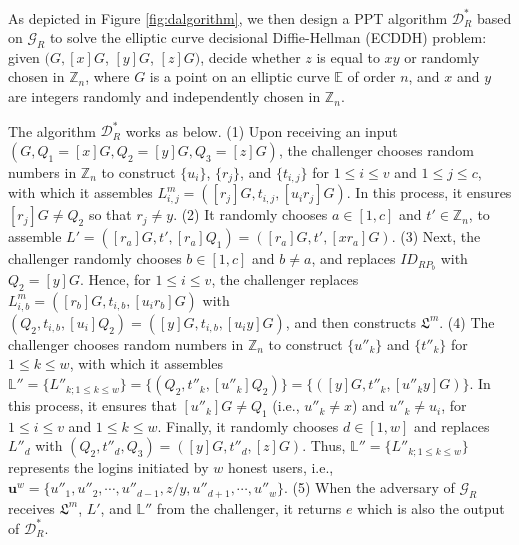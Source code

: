 As depicted in Figure \ref{fig:dalgorithm}, we then design a PPT algorithm $\mathcal{D}^*_R$ based on $\mathcal{G}_R$ to solve the elliptic curve decisional Diffie-Hellman (ECDDH) problem: given $(G, [x]G$, $[y]G$, $[z]G)$, decide whether $z$ is equal to $xy$ or randomly chosen in $\mathbb{Z}_n$, where $G$ is a point on an elliptic curve $\mathbb{E}$ of order $n$, and $x$ and $y$ are integers randomly and independently chosen in $\mathbb{Z}_n$.


The algorithm $\mathcal{D}^*_R$ works as below. (1) Upon receiving an input $(G, Q_1=[x]G, Q_2=[y]G, Q_3=[z]G)$, %
the challenger
chooses random numbers in $\mathbb{Z}_n$ to construct $\{u_i\}$, $\{r_j\}$, and $\{t_{i, j}\}$ for $1 \le i \le v$ and $1 \le j \le c$, with which it assembles $L^m_{i, j}=([r_j]G, t_{i,j}, [u_ir_j]G)$.
In this process, it ensures $[r_{j}]G \neq Q_2$ so that $r_j \neq y$.  %
(2) It randomly chooses $a \in [1, c]$ and $t' \in \mathbb{Z}_n$, to assemble $L' = ([r_{a}]G, t', [r_{a}]Q_1) = ([r_{a}]G, t', [xr_{a}]G)$.
(3)
Next, the challenger randomly chooses $b \in [1, c]$ and $b \neq a$, and replaces $ID_{RP_b}$ with $Q_2 = [y]G$.
Hence, for $1 \le i \le v$, the challenger replaces $L^m_{i, b}=([r_b]G, t_{i,b}, [u_ir_b]G)$ with $(Q_2, t_{i,b}, [u_i]Q_2) = ([y]G, t_{i,b}, [u_iy]G)$, and then constructs $\mathfrak{L}^m$.
(4) The challenger chooses random numbers in $\mathbb{Z}_n$ to construct $\{u''_k\}$ and $\{t''_k\}$ for $1 \leq k \leq w$,
 with which it assembles $\mathbb{L}'' = \{L''_{k; 1\leq k \leq w}\} = \{(Q_2, t''_k, [u''_k]Q_2)\} = \{([y]G, t''_k, [u''_ky]G)\}$.
In this process, it ensures that $[u''_k]G \neq Q_1$ (i.e., $u''_k \neq x$) and $u''_k \neq u_i$,
 for $1 \le i \le v$ and $1 \le k \le w$.
Finally, it randomly chooses $d \in [1, w]$ and replaces $L''_{d}$ with $(Q_2, t''_d, Q_3) = ([y]G, t''_d, [z]G)$.
 Thus, $\mathbb{L}'' = \{L''_{k;1\leq k \leq w}\}$ represents the logins initiated by $w$ honest users, i.e., $\mathbf{u}^w=\{u''_1, u''_2, \cdots, u''_{d-1}, z/y, u''_{d+1}, \cdots, u''_w\}$.
 (5) When the adversary of $\mathcal{G}_R$ receives $\mathfrak{L}^m$, $L'$, and $\mathbb{L}''$ from the challenger, it returns $e$ which is also the output of $\mathcal{D}^*_R$.

